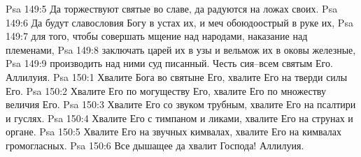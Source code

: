 Psa 149:5  Да торжествуют святые во славе, да радуются на ложах своих.
Psa 149:6  Да будут славословия Богу в устах их, и меч обоюдоострый в руке их,
Psa 149:7  для того, чтобы совершать мщение над народами, наказание над племенами,
Psa 149:8  заключать царей их в узы и вельмож их в оковы железные,
Psa 149:9  производить над ними суд писанный. Честь сия--всем святым Его. Аллилуия.
Psa 150:1  Хвалите Бога во святыне Его, хвалите Его на тверди силы Его.
Psa 150:2  Хвалите Его по могуществу Его, хвалите Его по множеству величия Его.
Psa 150:3  Хвалите Его со звуком трубным, хвалите Его на псалтири и гуслях.
Psa 150:4  Хвалите Его с тимпаном и ликами, хвалите Его на струнах и органе.
Psa 150:5  Хвалите Его на звучных кимвалах, хвалите Его на кимвалах громогласных.
Psa 150:6  Все дышащее да хвалит Господа! Аллилуия.


